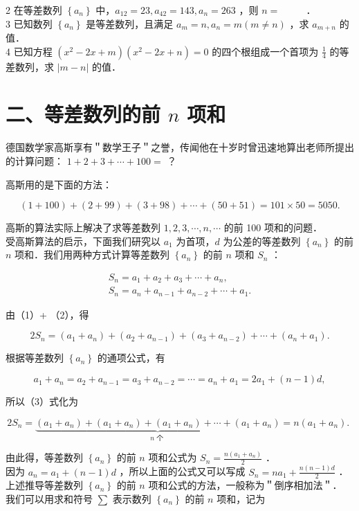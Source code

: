\documentclass[10pt]{article}
\begin{document}
2 在等差数列 \(\left\{a_{n}\right\}\) 中，\(a_{12}=23, a_{42}=143, a_{n}=263\) ，则 \(n=\) \(\qquad\) ．\\
3 已知数列 \(\left\{a_{n}\right\}\) 是等差数列，且满足 \(a_{m}=n, a_{n}=m(m \neq n)\) ，求 \(a_{m+n}\) 的值．\\
4 已知方程 \(\left(x^{2}-2 x+m\right)\left(x^{2}-2 x+n\right)=0\) 的四个根组成一个首项为 \(\frac{1}{4}\) 的等差数列，求 \(|m-n|\) 的值．

\section*{二、等差数列的前 \(n\) 项和}
德国数学家高斯享有＂数学王子＂之誉，传闻他在十岁时曾迅速地算出老师所提出的计算问题： \(1+2+3+\cdots+100=\) ？

高斯用的是下面的方法：

\[
(1+100)+(2+99)+(3+98)+\cdots+(50+51)=101 \times 50=5050 .
\]

高斯的算法实际上解决了求等差数列 \(1,2,3, \cdots, n, \cdots\) 的前 100 项和的问题．\\
受高斯算法的启示，下面我们研究以 \(a_{1}\) 为首项，\(d\) 为公差的等差数列 \(\left\{a_{n}\right\}\) 的前 \(n\) 项和．我们用两种方式计算等差数列 \(\left\{a_{n}\right\}\) 的前 \(n\) 项和 \(S_{n}\) ：

\[
\begin{gathered}
S_{n}=a_{1}+a_{2}+a_{3}+\cdots+a_{n}, \\
S_{n}=a_{n}+a_{n-1}+a_{n-2}+\cdots+a_{1} .
\end{gathered}
\]

由（1）+ （2），得

\[
2 S_{n}=\left(a_{1}+a_{n}\right)+\left(a_{2}+a_{n-1}\right)+\left(a_{3}+a_{n-2}\right)+\cdots+\left(a_{n}+a_{1}\right) .
\]

根据等差数列 \(\left\{a_{n}\right\}\) 的通项公式，有

\[
a_{1}+a_{n}=a_{2}+a_{n-1}=a_{3}+a_{n-2}=\cdots=a_{n}+a_{1}=2 a_{1}+(n-1) d,
\]

所以（3）式化为

\[
2 S_{n}=\underbrace{\left(a_{1}+a_{n}\right)+\left(a_{1}+a_{n}\right)+\left(a_{1}+a_{n}\right)+\cdots+\left(a_{1}+a_{n}\right)}_{n \text { 个 }}=n\left(a_{1}+a_{n}\right) \text {. }
\]

由此得，等差数列 \(\left\{a_{n}\right\}\) 的前 \(n\) 项和公式为 \(S_{n}=\frac{n\left(a_{1}+a_{n}\right)}{2}\) ．\\
因为 \(a_{n}=a_{1}+(n-1) d\) ，所以上面的公式又可以写成 \(S_{n}=n a_{1}+\frac{n(n-1) d}{2}\) ．\\
上述推导等差数列 \(\left\{a_{n}\right\}\) 的前 \(n\) 项和公式的方法，一般称为＂倒序相加法＂．\\
我们可以用求和符号 \(\sum\) 表示数列 \(\left\{a_{n}\right\}\) 的前 \(n\) 项和，记为
\end{document}
